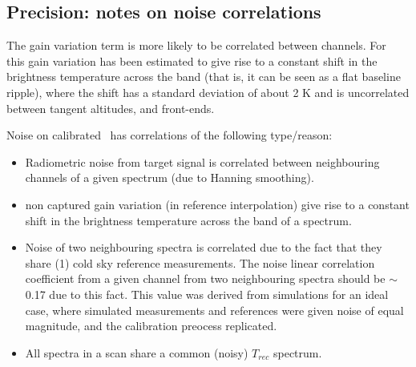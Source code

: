 


\subsection*{Precision: notes on noise correlations}

The gain variation term is more likely to be correlated between channels.
For \smr\, this gain variation has been estimated to give rise to a constant 
shift in the brightness temperature across the band (that is, it can 
be seen as a flat baseline ripple), where the shift
has a standard deviation of about 2 K and is uncorrelated 
between tangent altitudes, and front-ends.

Noise on calibrated \smr\ has correlations of the following type/reason:

\begin{itemize}

\item Radiometric noise from target signal is correlated between 
neighbouring channels of a given spectrum (due to Hanning smoothing).

\item non captured gain variation (in reference interpolation) give 
rise to a constant shift in the brightness temperature across the 
band of a spectrum.

\item Noise of two neighbouring spectra is correlated due to
the fact that they share (1) cold sky reference measurements. 
The noise linear correlation coefficient from a given channel
from two neighbouring spectra should be \(\sim\)\,0.17 due to this
fact. This value was derived from simulations for an ideal
case, where simulated measurements and references were 
given noise of equal magnitude, and the calibration
preocess replicated.

\item All spectra in a scan share a common (noisy) \(T_{rec}\)
spectrum. 

\end{itemize}

